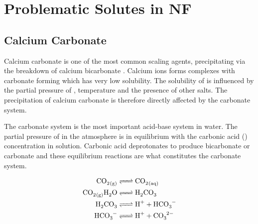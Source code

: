 \section{Problematic Solutes in NF}



\subsection{Calcium Carbonate }
\label{Calcium_carbonate_carbonatesystem_teori}


Calcium carbonate is one of the most common scaling agents, precipitating via the breakdown of calcium bicarbonate \citep{IntroductionCoolingTower2014}. 
Calcium ions forms complexes with carbonate forming  which has very low solubility. \citep{WaterChemistry1980}
The solubility of  is influenced by the partial pressure of , temperature and the presence of other salts. %
The precipitation of calcium carbonate is therefore directly affected by the carbonate system. \citep{WaterChemistry1980}



The carbonate system is the most important acid-base system in water. \citep{WaterChemistry1980}
The partial pressure of  in the atmosphere is in equilibrium with the carbonic acid () concentration in solution. 
Carbonic acid deprotonates to produce bicarbonate or carbonate and these equilibrium reactions are what constitutes the carbonate system.\citep{WaterChemistry1980} 

\begin{align}
    \cee{CO2_{(g)} &<=> CO2_{(aq)}} \\
    \cee{CO2_{(g)} H2O &<=> H2CO3}\\ 
    \cee{H2CO3 &<=> H+ + HCO3-} \\
    \cee{HCO3- &<=> H+ + CO3^{2-}}
\end{align}

